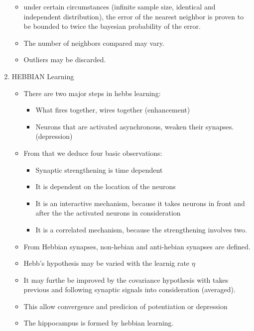 \documentclass{scrartcl}
\begin{document}
\begin{enumerate}
\begin{itemize}
	\item under certain circumstances (infinite sample size, identical and independent distribution), the error of the nearest neighbor is proven to be bounded to twice the bayesian probability of the error.
	\item The number of neighbors compared may vary.
	\item Outliers may be discarded.
	\end{itemize}
	
\item HEBBIAN Learning
	\begin{itemize}
	\item There are two major steps in hebbs learning:
		\begin{itemize}
			\item What fires together, wires together (enhancement)
			\item Neurons that are activated asynchronous, weaken their synapses. (depression)
		\end{itemize}
		\item From that we deduce four basic observations:
			\begin{itemize}
			\item Synaptic strengthening is time dependent
			\item It is dependent on the location of the neurons
			\item It is an interactive mechanism, because it takes neurons in front and after the the activated neurons in consideration
			\item It is a correlated mechanism, because the strengthening involves two. 
			\end{itemize}
		\item From Hebbian synapses, non-hebian and anti-hebian synapses are defined.
		\item Hebb's hypothesis may be varied with the learnig rate $\eta$
		\item It may furthe be improved by the covariance hypothesis with takes previous and following synaptic signals into consideration (averaged).
		\item This allow convergence and predicion of potentiation or depression
		\item The hippocampus is formed by hebbian learning. 
	\end{itemize}
	

\end{enumerate}
\end{document}
